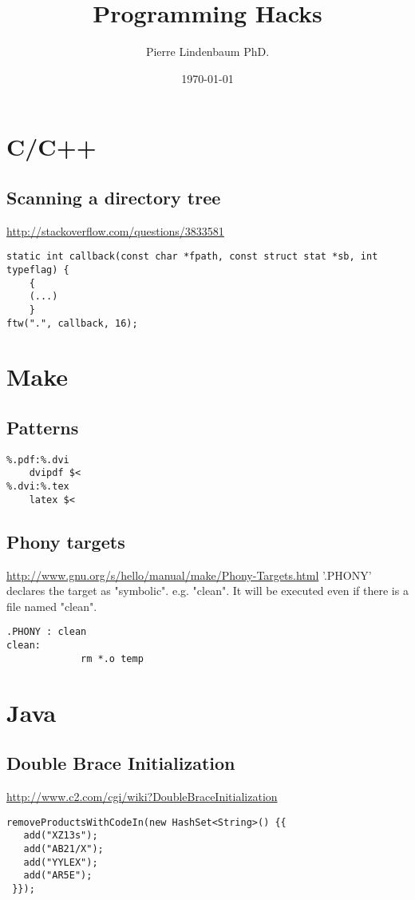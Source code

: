 \documentclass[12pt]{article}
\title{Programming Hacks}
\author{Pierre Lindenbaum PhD.}
\date{\today}
\begin{document}
\maketitle

\tableofcontents

\section{C/C++}
\subsection{Scanning a directory tree}
\url{http://stackoverflow.com/questions/3833581}
\begin{lstlisting}
static int callback(const char *fpath, const struct stat *sb, int typeflag) {
	{
	(...)
	}
ftw(".", callback, 16);
\end{lstlisting}

\section{Make}
\subsection{Patterns}
\begin{lstlisting}
%.pdf:%.dvi
	dvipdf $<
%.dvi:%.tex
	latex $<
\end{lstlisting}
\subsection{Phony targets}
\url{http://www.gnu.org/s/hello/manual/make/Phony-Targets.html}
'.PHONY' declares the target as "symbolic". e.g. "clean". It will be executed even if there is a file named "clean".
\begin{lstlisting}
.PHONY : clean
clean:
             rm *.o temp
\end{lstlisting}

\section{Java}
\subsection{Double Brace Initialization}
\url{http://www.c2.com/cgi/wiki?DoubleBraceInitialization}
\begin{lstlisting}
removeProductsWithCodeIn(new HashSet<String>() {{
   add("XZ13s");
   add("AB21/X");
   add("YYLEX");
   add("AR5E");
 }});
\end{lstlisting}
\end{document}
